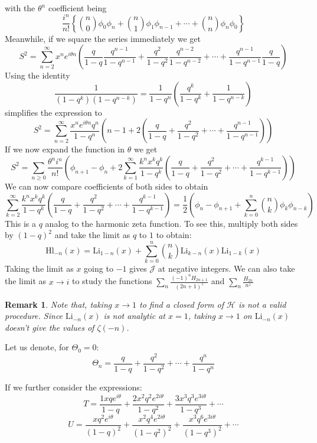 \documentclass{article}
\newtheorem{remark}{Remark}%
\begin{document}
with the $\theta^n$ coefficient being $$\frac{i^n}{n!}\left\{\binom{n}{0}\phi_0\phi_{n}+\binom{n}{1}\phi_1\phi_{n-1}+\cdots+\binom{n}{n}\phi_{n}\phi_0\right\}$$
Meanwhile, if we square the series immediately we get
$$S^2=\sum_{n=2}^{\infty}x^n e^{i\theta n}\left(\frac{q}{1-q}\frac{q^{n-1}}{1-q^{n-1}}+\frac{q^2}{1-q^2}\frac{q^{n-2}}{1-q^{n-2}}+\cdots+\frac{q^{n-1}}{1-q^{n-1}}\frac{q}{1-q}\right)$$
Using the identity $$\frac{1}{(1-q^k)(1-q^{n-k})}=\frac{1}{1-q^n}\left(\frac{q^k}{1-q^k}+\frac{1}{1-q^{n-k}}\right)$$
simplifies the expression to
$$S^2=\sum_{n=2}^{\infty}\frac{x^ne^{i\theta n} q^n}{1-q^n}\left(n-1+2\left(\frac{q}{1-q}+\frac{q^2}{1-q^2}+\cdots+\frac{q^{n-1}}{1-q^{n-1}}\right)\right)$$
If we now expand the function in $\theta$ we get  $$S^2=\sum_{n\geq 0}\frac{\theta^ni^n}{n!}\left(\phi_{n+1}-\phi_n+2\sum_{k=1}^{\infty}\frac{k^nx^k q^k}{1-q^k}\left(\frac{q}{1-q}+\frac{q^2}{1-q^2}+\cdots+\frac{q^{k-1}}{1-q^{k-1}}\right)\right)$$
We can now compare coefficients of both sides to obtain \begin{equation}
    \sum_{k=2}^{\infty}\frac{k^nx^kq^k}{1-q^k}\left(\frac{q}{1-q}+\frac{q^2}{1-q^2}+\cdots+\frac{q^{k-1}}{1-q^{k-1}}\right)=\frac{1}{2}\left(\phi_n-\phi_{n+1}+\sum_{k=0}^n\binom{n}{k}\phi_k\phi_{n-k}\right)
\end{equation}
This is a $q$ analog to the harmonic zeta function. To see this, multiply both sides by $(1-q)^2$ and take the limit as $q$ to $1$ to obtain:
\begin{equation}\label{harmonic polylogarithm in terms of polylog}
    \mathrm{Hl}_{-n}(x)=\mathrm{Li}_{1-n}(x)+\sum_{k=0}^n\binom{n}{k}\mathrm{Li}_{k-n}(x)\mathrm{Li}_{1-k}(x)
\end{equation}
Taking the limit as $x$ going to $-1$ gives $\mathcal{J}$ at negative integers. We can also take the limit as $x\to i$ to study the functions $\sum_n \frac{(-1)^n H_{2n+1}}{(2n+1)^z}$ and $\sum_n \frac{H_{2n}}{n^z}$
\begin{remark}
   Note that, taking $x\to 1$ to find a closed form of $\mathcal H$ is not a valid procedure. Since $\mathrm{Li}_{-n}(x)$ is not analytic at $x=1$, taking $x\to 1$ on $\mathrm{Li}_{-n}(x)$ doesn't give the values of $\zeta(-n)$.
\end{remark}
Let us denote, for $\Theta_0=0$: $$\Theta_n=\frac{q}{1-q}+\frac{q^2}{1-q^2}+\cdots +\frac{q^n}{1-q^n}$$

\par
If we further consider the expressions:
$$T=\frac{1xq e^{i\theta}}{1-q}+\frac{2 x^2 q^2 e^{2i\theta}}{1-q^2}+\frac{3x^3 q^3e^{3i\theta}}{1-q^3}+\cdots$$
$$U=\frac{xq^2 e^{i\theta}}{(1-q)^2}+\frac{x^2 q^4 e^{2i\theta}}{(1-q^2)^2}+\frac{x^3 q^6e^{3i\theta}}{(1-q^3)^2}+\cdots$$
\end{document}
